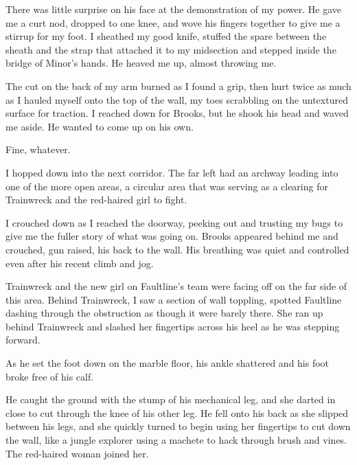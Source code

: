 There was little surprise on his face at the demonstration of my power.  He gave me a curt nod, dropped to one knee, and wove his fingers together to give me a stirrup for my foot.  I sheathed my good knife, stuffed the spare between the sheath and the strap that attached it to my midsection and stepped inside the bridge of Minor's hands.  He heaved me up, almost throwing me.



The cut on the back of my arm burned as I found a grip, then hurt twice as much as I hauled myself onto the top of the wall, my toes scrabbling on the untextured surface for traction.  I reached down for Brooks, but he shook his head and waved me aside.  He wanted to come up on his own.



Fine, whatever.



I hopped down into the next corridor.  The far left had an archway leading into one of the more open areas, a circular area that was serving as a clearing for Trainwreck and the red-haired girl to fight.



I crouched down as I reached the doorway, peeking out and trusting my bugs to give me the fuller story of what was going on.  Brooks appeared behind me and crouched, gun raised, his back to the wall.  His breathing was quiet and controlled even after his recent climb and jog.



Trainwreck and the new girl on Faultline's team were facing off on the far side of this area.  Behind Trainwreck, I saw a section of wall toppling, spotted Faultline dashing through the obstruction as though it were barely there.  She ran up behind Trainwreck and slashed her fingertips across his heel as he was stepping forward.



As he set the foot down on the marble floor, his ankle shattered and his foot broke free of his calf.



He caught the ground with the stump of his mechanical leg, and she darted in close to cut through the knee of his other leg.  He fell onto his back as she slipped between his legs, and she quickly turned to begin using her fingertips to cut down the wall, like a jungle explorer using a machete to hack through brush and vines.  The red-haired woman joined her.



